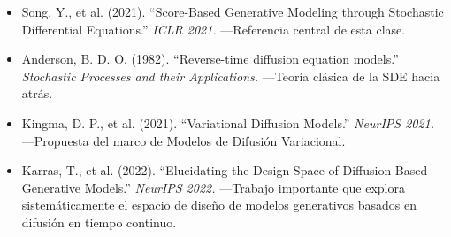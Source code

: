 \begin{itemize}
    \item Song, Y., et al. (2021). ``Score-Based Generative Modeling through Stochastic Differential Equations.'' \textit{ICLR 2021.} —Referencia central de esta clase.
    \item Anderson, B. D. O. (1982). ``Reverse-time diffusion equation models.'' \textit{Stochastic Processes and their Applications.} —Teoría clásica de la SDE hacia atrás.
    \item Kingma, D. P., et al. (2021). ``Variational Diffusion Models.'' \textit{NeurIPS 2021.} —Propuesta del marco de Modelos de Difusión Variacional.
    \item Karras, T., et al. (2022). ``Elucidating the Design Space of Diffusion-Based Generative Models.'' \textit{NeurIPS 2022.} —Trabajo importante que explora sistemáticamente el espacio de diseño de modelos generativos basados en difusión en tiempo continuo.
\end{itemize}




